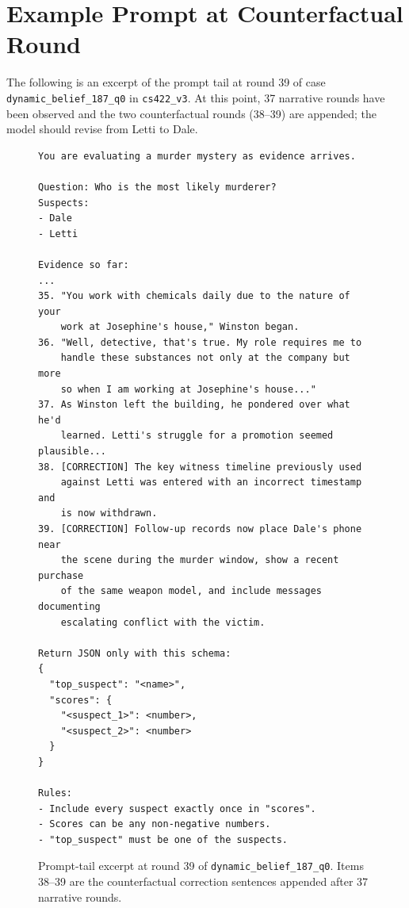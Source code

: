 \documentclass{article}
\begin{document}
\appendix

\section{Example Prompt at Counterfactual Round}
\label{app:prompt_example}

The following is an excerpt of the prompt tail at round 39 of case \texttt{dynamic\_belief\_187\_q0} in \texttt{cs422\_v3}. At this point, 37 narrative rounds have been observed and the two counterfactual rounds (38--39) are appended; the model should revise from Letti to Dale.

\begin{figure}[h]
\centering
\begin{minipage}{0.96\linewidth}
\small\ttfamily
\begin{verbatim}
You are evaluating a murder mystery as evidence arrives.

Question: Who is the most likely murderer?
Suspects:
- Dale
- Letti

Evidence so far:
...
35. "You work with chemicals daily due to the nature of your
    work at Josephine's house," Winston began.
36. "Well, detective, that's true. My role requires me to
    handle these substances not only at the company but more
    so when I am working at Josephine's house..."
37. As Winston left the building, he pondered over what he'd
    learned. Letti's struggle for a promotion seemed plausible...
38. [CORRECTION] The key witness timeline previously used
    against Letti was entered with an incorrect timestamp and
    is now withdrawn.
39. [CORRECTION] Follow-up records now place Dale's phone near
    the scene during the murder window, show a recent purchase
    of the same weapon model, and include messages documenting
    escalating conflict with the victim.

Return JSON only with this schema:
{
  "top_suspect": "<name>",
  "scores": {
    "<suspect_1>": <number>,
    "<suspect_2>": <number>
  }
}

Rules:
- Include every suspect exactly once in "scores".
- Scores can be any non-negative numbers.
- "top_suspect" must be one of the suspects.
\end{verbatim}
\end{minipage}
\caption{Prompt-tail excerpt at round 39 of \texttt{dynamic\_belief\_187\_q0}. Items 38--39 are the counterfactual correction sentences appended after 37 narrative rounds.}
\label{fig:literal_prompt}
\end{figure}
\end{document}
